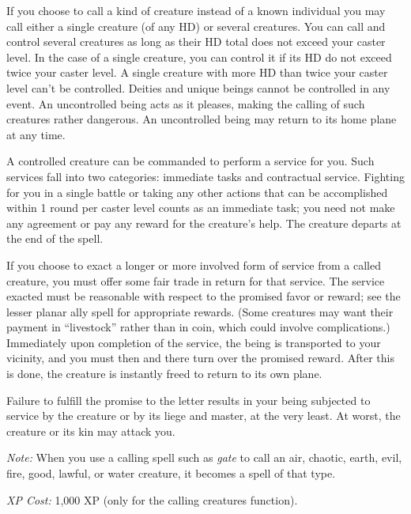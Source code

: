 {	If you choose to call a kind of creature instead of a known individual you may call either a single creature (of any HD) or several creatures. You can call and control several creatures as long as their HD total does not exceed your caster level. In the case of a single creature, you can control it if its HD do not exceed twice your caster level. A single creature with more HD than twice your caster level can't be controlled. Deities and unique beings cannot be controlled in any event. An uncontrolled being acts as it pleases, making the calling of such creatures rather dangerous. An uncontrolled being may return to its home plane at any time.

	A controlled creature can be commanded to perform a service for you. Such services fall into two categories: immediate tasks and contractual service. Fighting for you in a single battle or taking any other actions that can be accomplished within 1 round per caster level counts as an immediate task; you need not make any agreement or pay any reward for the creature's help. The creature departs at the end of the spell.

	If you choose to exact a longer or more involved form of service from a called creature, you must offer some fair trade in return for that service. The service exacted must be reasonable with respect to the promised favor or reward; see the lesser planar ally spell for appropriate rewards. (Some creatures may want their payment in ``livestock'' rather than in coin, which could involve complications.) Immediately upon completion of the service, the being is transported to your vicinity, and you must then and there turn over the promised reward. After this is done, the creature is instantly freed to return to its own plane.

	Failure to fulfill the promise to the letter results in your being subjected to service by the creature or by its liege and master, at the very least. At worst, the creature or its kin may attack you.

	\textit{Note:} When you use a calling spell such as \emph{gate} to call an air, chaotic, earth, evil, fire, good, lawful, or water creature, it becomes a spell of that type.

	\textit{XP Cost:}
	1,000 XP (only for the calling creatures function).

}
